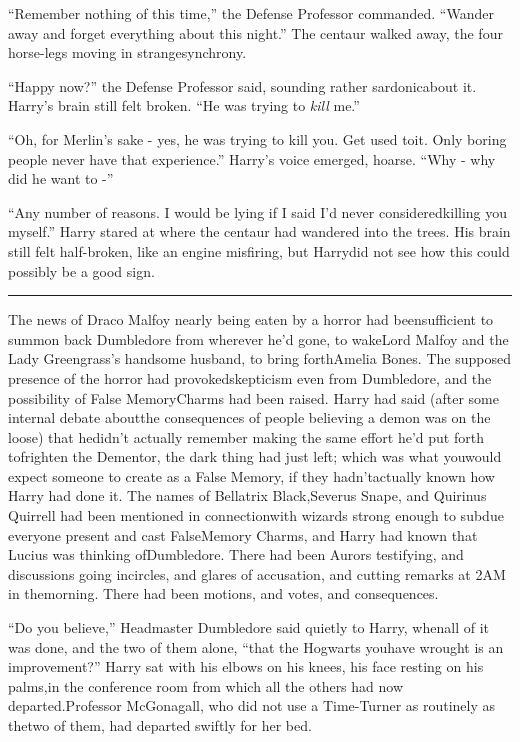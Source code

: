``Remember nothing of this time,'' the Defense Professor commanded.
``Wander away and forget everything about this night.''
The centaur walked away, the four horse-legs moving in strangesynchrony.

``Happy now?'' the Defense Professor said, sounding rather sardonicabout it.
Harry's brain still felt broken. ``He was trying to \emph{kill} me.''

``Oh, for Merlin's sake - yes, he was trying to kill you. Get used toit. Only boring people never have that experience.''
Harry's voice emerged, hoarse. ``Why - why did he want to -''

``Any number of reasons. I would be lying if I said I'd never consideredkilling you myself.''
Harry stared at where the centaur had wandered into the trees.
His brain still felt half-broken, like an engine misfiring, but Harrydid not see how this could possibly be a good sign.

\begin{center}\rule{3in}{0.4pt}\end{center}
The news of Draco Malfoy nearly being eaten by a horror had beensufficient to summon back Dumbledore from wherever he'd gone, to wakeLord Malfoy and the Lady Greengrass's handsome husband, to bring forthAmelia Bones. The supposed presence of the horror had provokedskepticism even from Dumbledore, and the possibility of False MemoryCharms had been raised. Harry had said (after some internal debate aboutthe consequences of people believing a demon was on the loose) that hedidn't actually remember making the same effort he'd put forth tofrighten the Dementor, the dark thing had just left; which was what youwould expect someone to create as a False Memory, if they hadn'tactually known how Harry had done it. The names of Bellatrix Black,Severus Snape, and Quirinus Quirrell had been mentioned in connectionwith wizards strong enough to subdue everyone present and cast FalseMemory Charms, and Harry had known that Lucius was thinking ofDumbledore. There had been Aurors testifying, and discussions going incircles, and glares of accusation, and cutting remarks at 2AM in themorning. There had been motions, and votes, and consequences.

``Do you believe,'' Headmaster Dumbledore said quietly to Harry, whenall of it was done, and the two of them alone, ``that the Hogwarts youhave wrought is an improvement?''
Harry sat with his elbows on his knees, his face resting on his palms,in the conference room from which all the others had now departed.Professor McGonagall, who did not use a Time-Turner as routinely as thetwo of them, had departed swiftly for her bed.

